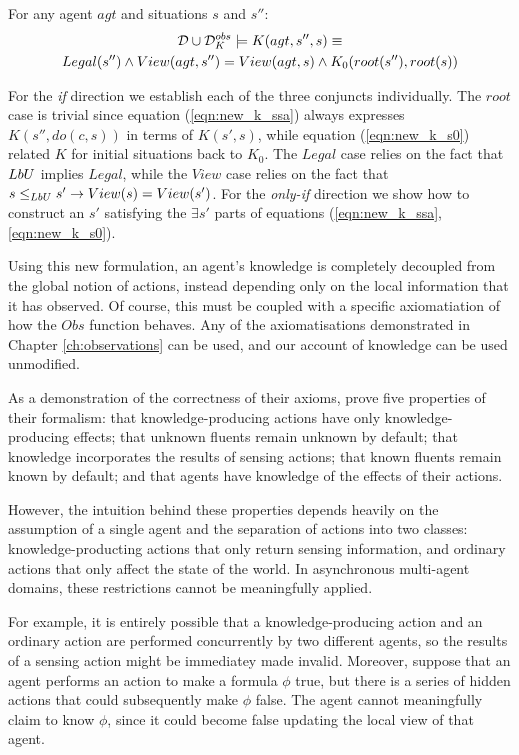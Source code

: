 \begin{thm}
\label{thm:k_obs_equiv} For any agent $agt$ and situations $s$
and $s''$:\begin{multline*}
\mathcal{D}\cup\mathcal{D}_{K}^{obs}\models K(agt,s'',s)\equiv\\
Legal(s'')\wedge View(agt,s'')=View(agt,s)\wedge K_{0}(root(s''),root(s))\end{multline*}

\end{thm}
\begin{proofsketch}
For the \emph{if} direction we establish each of the three conjuncts
individually. The $root$ case is trivial since equation (\ref{eqn:new_k_ssa})
always expresses $K(s'',do(c,s))$ in terms of $K(s',s)$, while equation
(\ref{eqn:new_k_s0}) related $K$ for initial situations back to
$K_{0}$. The $Legal$ case relies on the fact that $LbU$ implies
$Legal$, while the $View$ case relies on the fact that $s\leq_{LbU}s'\rightarrow View(s)=View(s')$.
For the \emph{only-if} direction we show how to construct an $s'$
satisfying the $\exists s'$ parts of equations (\ref{eqn:new_k_ssa},\ref{eqn:new_k_s0}). 
\end{proofsketch}
Using this new formulation, an agent's knowledge is completely decoupled
from the global notion of actions, instead depending only on the local
information that it has observed. Of course, this must be coupled
with a specific axiomatiation of how the $Obs$ function behaves.
Any of the axiomatisations demonstrated in Chapter \ref{ch:observations}
can be used, and our account of knowledge can be used unmodified.

As a demonstration of the correctness of their axioms, \citet{scherl03sc_knowledge}
prove five properties of their formalism: that knowledge-producing
actions have only knowledge-producing effects; that unknown fluents
remain unknown by default; that knowledge incorporates the results
of sensing actions; that known fluents remain known by default; and
that agents have knowledge of the effects of their actions.

However, the intuition behind these properties depends heavily on
the assumption of a single agent and the separation of actions into
two classes: knowledge-producting actions that only return sensing
information, and ordinary actions that only affect the state of the
world. In asynchronous multi-agent domains, these restrictions cannot
be meaningfully applied.

For example, it is entirely possible that a knowledge-producing action
and an ordinary action are performed concurrently by two different
agents, so the results of a sensing action might be immediatey made
invalid. Moreover, suppose that an agent performs an action to make
a formula $\phi$ true, but there is a series of hidden actions that
could subsequently make $\phi$ false. The agent cannot meaningfully
claim to know $\phi$, since it could become false updating the local
view of that agent.

